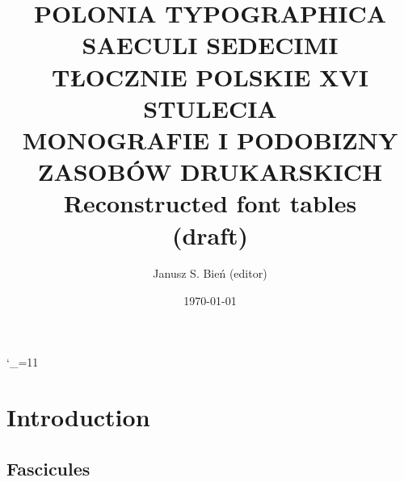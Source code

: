 \documentclass[12pt]{article}
\begin{document}
\title{POLONIA TYPOGRAPHICA
  SAECULI SEDECIMI\\
  { TŁOCZNIE POLSKIE XVI STULECIA\\ MONOGRAFIE I PODOBIZNY
    ZASOBÓW DRUKARSKICH}\\Reconstructed font tables\\
  (draft)}

\author{Janusz S. Bień (editor)}

\date{\today}

\maketitle


 \catcode`\_=11




\def\Hb#1{{\fontspec{Junicode}#1}}

\newcommand{\alfa}{\textit{alpha} (\J{α})}
\renewcommand{\alpha}{\textit{alpha} (\J{α})}
\renewcommand{\beta}{\textit{beta} (\J{β})}
\renewcommand{\delta}{\textit{delta} (\J{δ})}
\renewcommand{\epsilon}{\textit{epsilon} (\J{ε})}
\renewcommand{\eta}{\textit{eta} (\J{η})}
\renewcommand{\zeta}{\textit{zeta} (\J{ζ})}
\renewcommand{\theta}{\textit{theta} (\J{θ})}
\renewcommand{\gamma}{\textit{gamma} (\J{γ})}
\renewcommand{\chi}{\textit{chi} (\J{χ})}
\renewcommand{\kappa}{\textit{kappa} (\J{κ})}
\renewcommand{\iota}{\textit{iota} (\J{ι})}
\renewcommand{\lambda}{\textit{lambda} (\J{λ})}

\newpage

\section{Introduction}
\label{sec:introduction}

\subsection{Fascicules}

\end{document}
